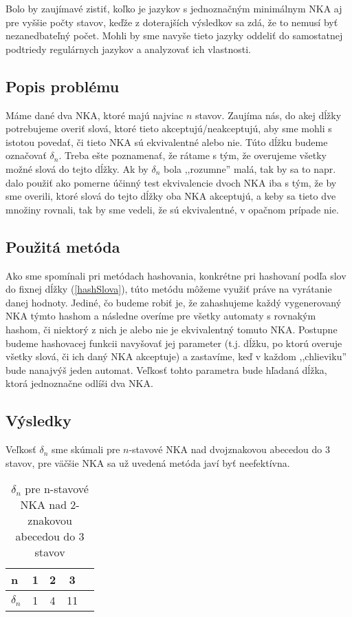 Bolo by zaujímavé zistiť, koľko je jazykov s jednoznačným minimálnym NKA aj pre vyššie počty stavov, keďže z doterajších výsledkov sa zdá, že to nemusí byť nezanedbateľný počet. Mohli by sme navyše tieto jazyky oddeliť do samostatnej podtriedy regulárnych jazykov a analyzovať ich vlastnosti.


\subsection{Popis problému}
Máme dané dva NKA, ktoré majú najviac $n$ stavov. Zaujíma nás, do akej dĺžky potrebujeme overiť slová, ktoré tieto akceptujú/neakceptujú, aby sme mohli s istotou povedať, či tieto NKA sú ekvivalentné alebo nie. Túto dĺžku budeme označovať $\delta_n$. Treba ešte poznamenať, že rátame s tým, že overujeme všetky možné slová do tejto dĺžky.  Ak by $\delta_n$ bola ,,rozumne'' malá, tak by sa to napr. dalo použiť ako pomerne účinný test ekvivalencie dvoch NKA iba s tým, že by sme overili, ktoré slová do tejto dĺžky oba NKA akceptujú, a keby sa tieto dve množiny rovnali, tak by sme vedeli, že sú ekvivalentné, v opačnom prípade nie.

\subsection{Použitá metóda}
Ako sme spomínali pri metódach hashovania, konkrétne pri hashovaní podľa slov do fixnej dĺžky (\ref{hashSlova}), túto metódu môžeme využiť práve na vyrátanie danej hodnoty. Jediné, čo budeme robiť je, že zahashujeme každý vygenerovaný NKA týmto hashom a následne overíme pre všetky automaty s rovnakým hashom, či niektorý z nich je alebo nie je ekvivalentný tomuto NKA. Postupne budeme hashovacej funkcii navyšovať jej parameter (t.j. dĺžku, po ktorú overuje všetky slová, či ich daný NKA akceptuje) a zastavíme, keď v každom ,,chlieviku'' bude nanajvýš jeden automat. Veľkosť tohto parametra bude hľadaná dĺžka, ktorá jednoznačne odlíši dva NKA.

\subsection{Výsledky}

Veľkosť $\delta_n$ sme skúmali pre $n$-stavové NKA nad dvojznakovou abecedou do 3 stavov, pre väčšie NKA sa už uvedená metóda javí byť neefektívna.

\begin{table}[h]
  \centering
  \begin{tabular}{|l|c|c|c|r|}
    \hline
    n & 1 & 2 & 3 \\ 
    \hline
    $\delta_n$ & 1 & 4 & 11 \\ 
    \hline
  \end{tabular}
  \caption{$\delta_n$ pre n-stavové  NKA nad 2-znakovou abecedou do 3 stavov}
\end{table}


